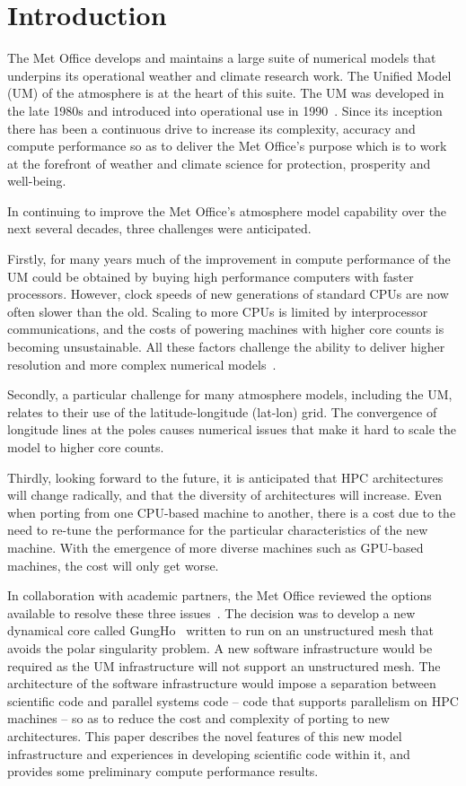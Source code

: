 \documentclass[review,times]{elsarticle}
\begin{document}
\newpage
\section{\label{sec:intro}Introduction}

The Met Office develops and maintains a large suite of numerical
models that underpins its operational weather and climate research
work. The Unified Model (UM) of the atmosphere is at the heart of this
suite. The UM was developed in the late 1980s and introduced into
operational use in 1990~\cite{gmd-10-1487-2017}. Since its inception
there has been a continuous drive to increase its complexity, accuracy
and compute performance so as to deliver the Met Office's purpose
which is to work at the forefront of weather and climate science for
protection, prosperity and well-being.

In continuing to improve the Met Office's atmosphere model capability
over the next several decades, three challenges were anticipated.

Firstly, for many years much of the improvement in compute performance
of the UM could be obtained by buying high performance computers with
faster processors. However, clock speeds of new generations of standard
CPUs are now often slower than the old. Scaling to more CPUs is
limited by interprocessor communications, and the costs of powering
machines with higher core counts is becoming unsustainable. All these
factors challenge the ability to deliver higher resolution and more
complex numerical models~\cite{gmd-2017-186}.

Secondly, a particular challenge for many atmosphere models, including
the UM, relates to their use of the latitude-longitude (lat-lon) grid.
The convergence of longitude lines at the poles causes numerical
issues that make it hard to scale the model to higher core counts.

Thirdly, looking forward to the future, it is anticipated that HPC
architectures will change radically, and that the diversity of
architectures will increase. Even when porting from one CPU-based
machine to another, there is a cost due to the need to re-tune the
performance for the particular characteristics of the new
machine. With the emergence of more diverse machines such as GPU-based
machines, the cost will only get worse.

In collaboration with academic partners, the Met Office reviewed the
options available to resolve these three issues~\cite{GHP1_CSR}. The
decision was to develop a new dynamical core called
GungHo~\cite{melvin2018} written to run on an unstructured mesh that
avoids the polar singularity problem. A new software infrastructure
would be required as the UM infrastructure will not support an
unstructured mesh. The architecture of the software infrastructure
would impose a separation between scientific code and parallel systems
code -- code that supports parallelism on HPC machines -- so as to
reduce the cost and complexity of porting to new architectures. This
paper describes the novel features of this new model infrastructure
and experiences in developing scientific code within it, and provides
some preliminary compute performance results.
\end{document}
